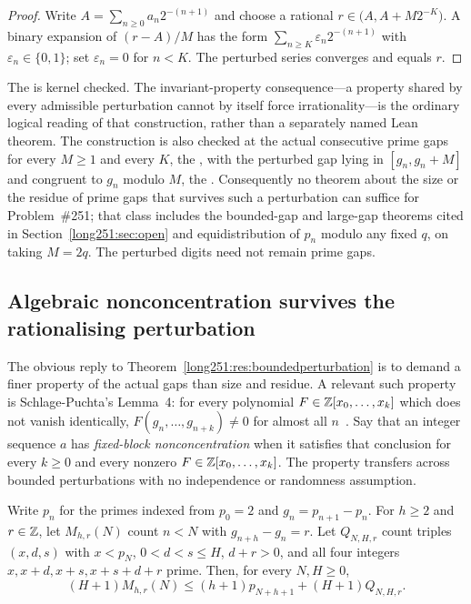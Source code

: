 \documentclass[11pt]{article}
\begin{document}
\begin{proof}
Write $A=\sum_{n\ge0}a_n2^{-(n+1)}$ and choose a rational
$r\in\bigl(A,A+M2^{-K}\bigr)$.  A binary expansion of $(r-A)/M$ has the form
$\sum_{n\ge K}\varepsilon_n2^{-(n+1)}$ with $\varepsilon_n\in\{0,1\}$; set
$\varepsilon_n=0$ for $n<K$.  The perturbed series converges and equals $r$.
\end{proof}

\noindent The
is kernel checked.  The invariant-property consequence---a property shared by
every admissible perturbation cannot by itself force irrationality---is the
ordinary logical reading of that construction, rather than a separately named
Lean theorem.  The construction is also
checked at the actual consecutive prime gaps for every $M\ge1$ and every $K$,
the
, with the perturbed gap lying in $[g_n,g_n+M]$ and
congruent to $g_n$ modulo $M$, the
.  Consequently no theorem about the size or the residue of prime gaps
that survives such a perturbation can suffice for Problem~\#251; that class
includes the bounded-gap and large-gap theorems cited in
Section~\ref{long251:sec:open} and equidistribution of $p_n$ modulo any fixed $q$, on
taking $M=2q$.  The perturbed digits need not remain prime gaps.

\subsection{Algebraic nonconcentration survives the rationalising perturbation}

The obvious reply to Theorem~\ref{long251:res:boundedperturbation} is to demand a
finer property of the actual gaps than size and residue.  A relevant such
property is Schlage-Puchta's Lemma~4: for every polynomial
$F\in\mathbb{Z}[x_0,\ldots,x_k]$ which does not vanish identically,
$F(g_n,\ldots,g_{n+k})\ne0$ for almost all $n$~\cite[Lemma~4,
pp.~5--6]{schlagepuchta2011}.  Say that an integer sequence $a$ has
\emph{fixed-block nonconcentration} when it satisfies that conclusion for
every $k\ge0$ and every nonzero $F\in\mathbb{Z}[x_0,\ldots,x_k]$.  The property
transfers across bounded perturbations with no independence or randomness
assumption.


\begin{proposition}\label{long251:res:shiftedcount}
Write $p_n$ for the primes indexed from $p_0=2$ and $g_n=p_{n+1}-p_n$.
For $h\ge2$ and $r\in\mathbb{Z}$, let $M_{h,r}(N)$ count $n<N$ with $g_{n+h}-g_n=r$.
Let $Q_{N,H,r}$ count triples $(x,d,s)$ with $x<p_N$,
$0<d<s\le H$, $d+r>0$, and all four integers
$x,x+d,x+s,x+s+d+r$ prime. Then, for every $N,H\ge0$,
\[
 (H+1)M_{h,r}(N)\le
 (h+1)p_{N+h+1}+(H+1)Q_{N,H,r}.
\]
\end{proposition}
\end{document}
